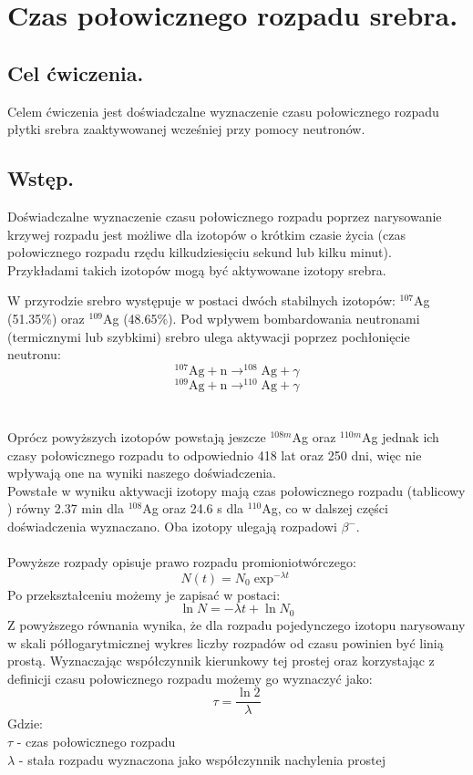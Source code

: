 \documentclass{article}
\begin{document}
\section{Czas połowicznego rozpadu srebra.}
\subsection{Cel ćwiczenia.}
   Celem ćwiczenia jest doświadczalne wyznaczenie czasu połowicznego rozpadu płytki srebra zaaktywowanej wcześniej przy pomocy neutronów.

\subsection{Wstęp.}
Doświadczalne wyznaczenie czasu połowicznego rozpadu poprzez narysowanie krzywej rozpadu jest możliwe dla izotopów o krótkim czasie życia (czas połowicznego rozpadu rzędu kilkudziesięciu sekund lub kilku minut).
Przykładami takich izotopów mogą być aktywowane izotopy srebra.

W przyrodzie srebro występuje w postaci dwóch stabilnych izotopów: $^{107}$Ag (51.35\%) oraz $^{109}$Ag (48.65\%). Pod wpływem bombardowania neutronami (termicznymi lub szybkimi) srebro ulega aktywacji poprzez pochłonięcie neutronu:\\
\[^{107}\text{Ag} + \text{n} \to ^{108}\text{Ag} + \gamma
\]
\[^{109}\text{Ag} + \text{n} \to ^{110}\text{Ag} + \gamma
\]\\\\
Oprócz powyższych izotopów powstają jeszcze $^{108m}$Ag oraz $^{110m}$Ag jednak ich czasy połowicznego rozpadu to odpowiednio 418 lat oraz 250 dni, więc nie wpływają one na wyniki naszego doświadczenia.\\
Powstałe w wyniku aktywacji izotopy mają czas połowicznego rozpadu (tablicowy \cite{1}) równy 2.37 min dla $^{108}$Ag oraz 24.6 s dla $^{110}$Ag, co w dalszej części doświadczenia wyznaczano. Oba izotopy ulegają rozpadowi $\beta ^-$. \\\\
Powyższe rozpady opisuje prawo rozpadu promioniotwórczego:
\begin{equation}
N(t) = N_0 \exp^{-\lambda t}
\end{equation}
Po przekształceniu możemy je zapisać w postaci:
\begin{equation}
\ln N = -\lambda t + \ln N_0
\label{wz_rozpad_log}
\end{equation}
Z powyższego równania wynika, że dla rozpadu pojedynczego izotopu narysowany w skali półlogarytmicznej wykres liczby rozpadów od czasu powinien być linią prostą. Wyznaczając współczynnik kierunkowy tej prostej oraz korzystając z definicji czasu połowicznego rozpadu możemy go wyznaczyć jako:
\begin{equation}
\tau = \frac{\ln 2}{\lambda}
\label{wz_tau}
\end{equation}
Gdzie:\\
$\tau$ - czas połowicznego rozpadu\\
$\lambda $ - stała rozpadu wyznaczona jako współczynnik nachylenia prostej\\
\end{document}
